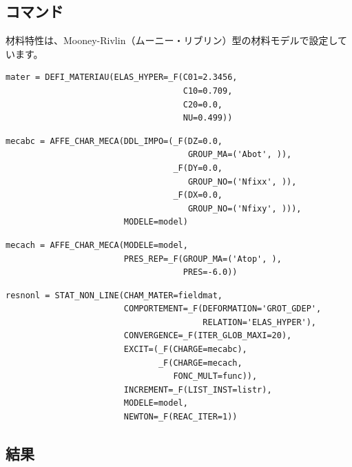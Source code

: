 \subsection{コマンド}
材料特性は、Mooney-Rivlin（ムーニー・リブリン）型の材料モデルで設定しています。
\begin{lstlisting}[caption =材料設定, label=材料設定]
mater = DEFI_MATERIAU(ELAS_HYPER=_F(C01=2.3456,
                                    C10=0.709,
                                    C20=0.0,
                                    NU=0.499))
\end{lstlisting}
\begin{lstlisting}[caption =拘束条件, label=拘束条件]
mecabc = AFFE_CHAR_MECA(DDL_IMPO=(_F(DZ=0.0,
                                     GROUP_MA=('Abot', )),
                                  _F(DY=0.0,
                                     GROUP_NO=('Nfixx', )),
                                  _F(DX=0.0,
                                     GROUP_NO=('Nfixy', ))),
                        MODELE=model)
\end{lstlisting}
\begin{lstlisting}[caption =荷重条件, label=荷重条件]
mecach = AFFE_CHAR_MECA(MODELE=model,
                        PRES_REP=_F(GROUP_MA=('Atop', ),
                                    PRES=-6.0))
\end{lstlisting}
\clearpage
\begin{lstlisting}[caption =非線形解析コマンド, label=非線形解析コマンド]
resnonl = STAT_NON_LINE(CHAM_MATER=fieldmat,
                        COMPORTEMENT=_F(DEFORMATION='GROT_GDEP',
                                        RELATION='ELAS_HYPER'),
                        CONVERGENCE=_F(ITER_GLOB_MAXI=20),
                        EXCIT=(_F(CHARGE=mecabc),
                               _F(CHARGE=mecach,
                                  FONC_MULT=func)),
                        INCREMENT=_F(LIST_INST=listr),
                        MODELE=model,
                        NEWTON=_F(REAC_ITER=1))
\end{lstlisting}
\clearpage
\subsection{結果}
